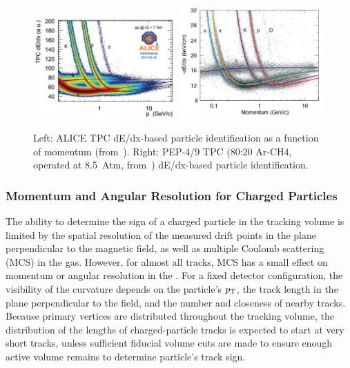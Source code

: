 \begin{figure}[htb]
\centering 
\includegraphics[width=0.49\textwidth]{graphics/ALICE_TPC_dEdx_Lippmann_2012.png}
\includegraphics[width=0.49\textwidth]{graphics/PEP4-TPC-80Ar-20CH4-8_5atm_dEdx.png} 
\caption{Left: ALICE TPC dE/dx-based particle identification as a function of momentum (from~\cite{ALICE_Lippmann}). Right: PEP-4/9 TPC (80:20 Ar-CH4, operated at 8.5~Atm, from~\cite{Grupen:1999by}) dE/dx-based particle identification.} 
\label{fig:ALICE_dEdx} 
\end{figure}

\subsubsection{Momentum and Angular Resolution for Charged Particles}
%
The ability to determine the sign of a charged particle in the  tracking volume is limited by the spatial resolution of the measured drift points in the plane perpendicular to the magnetic field, as well as multiple Coulomb scattering (MCS) in the gas. However, for almost all tracks, MCS has a small effect on momentum or angular resolution in the . For a fixed detector configuration, the visibility of the curvature depends on the particle's $p_{\rm{T}}$, the track length in the plane perpendicular to the field, and the number and closeness of nearby tracks.  Because primary vertices are distributed throughout the tracking volume, the distribution of the lengths of charged-particle tracks is expected to start at very short tracks, unless sufficient fiducial volume cuts are made to ensure enough active volume remains to determine particle's track sign.

